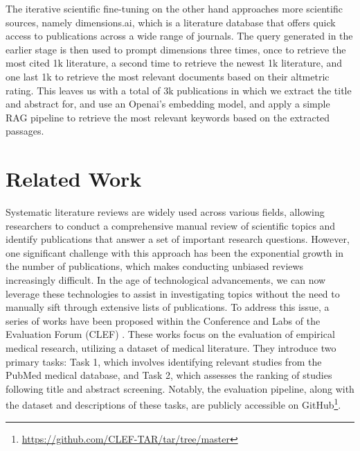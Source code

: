 The iterative scientific fine-tuning on the other hand approaches more scientific sources, namely dimensions.ai, which is a literature database that offers quick access to publications across a wide range of journals. The query generated in the earlier stage is then used to prompt dimensions three times, once to retrieve the most cited 1k literature, a second time to retrieve the newest 1k literature, and one last 1k to retrieve the most relevant documents based on their altmetric rating. This leaves us with a total of 3k publications in which we extract the title and abstract for, and use an Openai's embedding model, and apply a simple RAG pipeline to retrieve the most relevant keywords based on the extracted passages.


\section{Related Work}\label{sec:relwork}

Systematic literature reviews are widely used across various fields, allowing researchers to conduct a comprehensive manual review of scientific topics and identify publications that answer a set of important research questions. However, one significant challenge with this approach has been the exponential growth in the number of publications, which makes conducting unbiased reviews increasingly difficult. In the age of technological advancements, we can now leverage these technologies to assist in investigating topics without the need to manually sift through extensive lists of publications. To address this issue, a series of works have been proposed within the Conference and Labs of the Evaluation Forum (CLEF) \autocite{kanoulas2017clef, kanoulas2018clef, kanoulas2019clef}. These works focus on the evaluation of empirical medical research, utilizing a dataset of medical literature. They introduce two primary tasks: Task 1, which involves identifying relevant studies from the PubMed medical database, and Task 2, which assesses the ranking of studies following title and abstract screening. Notably, the evaluation pipeline, along with the dataset and descriptions of these tasks, are publicly accessible on GitHub\footnote{\url{https://github.com/CLEF-TAR/tar/tree/master}}.

